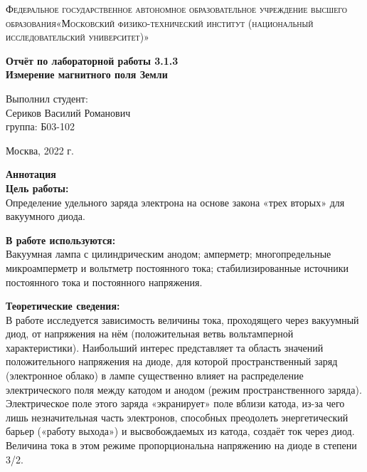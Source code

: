 \documentclass[a4paper, 12pt]{article}%
\begin{document}
	\begin{titlepage}
		\begin{center}
			\textsc{Федеральное государственное автономное образовательное учреждение высшего образования«Московский физико-технический институт (национальный исследовательский университет)»\\[5mm]
			}
			
			\vfill
			
			\textbf{Отчёт по лабораторной работы 3.1.3\\[3mm]
				Измерение магнитного поля Земли
				\\[50mm]
			}
			
		\end{center}
		
		\hfill
		\begin{minipage}{.5\textwidth}
			Выполнил студент:\\[2mm]
			Сериков Василий Романович\\[2mm]
			группа: Б03-102\\[5mm]
			
		\end{minipage}
		\vfill
		\begin{center}
			Москва, 2022 г.
		\end{center}
		
	\end{titlepage}
	
	\newpage
	\textbf{Аннотация}\\
	
	
	\textbf{Цель работы: }\\
	
	Определение удельного заряда электрона на основе закона
	«трех вторых» для вакуумного диода.
	
	\textbf{В работе используются: }\\
	
	Вакуумная лампа с цилиндрическим анодом;
	амперметр; многопредельные микроамперметр и вольтметр постоянного
	тока; стабилизированные источники постоянного тока и постоянного напряжения.
	
	
	\textbf{Теоретические сведения: } \\
	
	
	В работе исследуется зависимость величины тока, проходящего через
	вакуумный диод, от напряжения на нём (положительная ветвь вольтамперной характеристики). Наибольший интерес представляет та область значений положительного напряжения на диоде, для которой пространственный заряд (электронное облако) в лампе существенно влияет на распределение электрического поля между катодом и анодом (режим пространственного заряда). Электрическое поле этого заряда «экранирует» поле вблизи катода, из-за чего лишь незначительная часть электронов, способных преодолеть энергетический барьер («работу выхода») и высвобождаемых из катода, создаёт ток через диод. Величина тока в этом режиме пропорциональна напряжению на диоде в степени 3/2.
	
\end{document}

